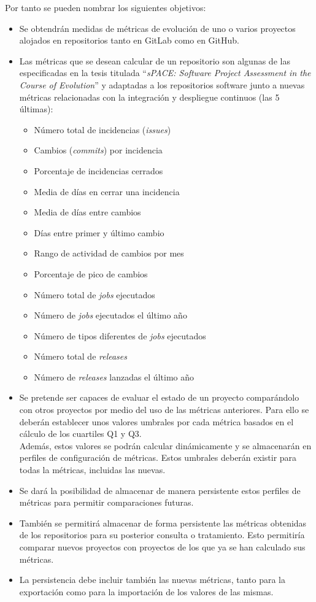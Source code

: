 Por tanto se pueden nombrar los siguientes objetivos:
\begin{itemize}
	\tightlist
	\item Se obtendrán medidas de métricas de evolución de uno o varios proyectos alojados en repositorios tanto en GitLab como en GitHub.
	\item Las métricas que se desean calcular de un repositorio  son algunas de las especificadas en la tesis titulada ``\textit{sPACE: Software Project Assessment in the Course of Evolution}'' \cite{ratzinger_space:_2007} y 
	adaptadas a los repositorios software junto a nuevas métricas relacionadas con la integración y despliegue continuos (las 5 últimas):
	\begin{itemize}
		\tightlist
		\item Número total de incidencias (\textit{issues})
		\item Cambios (\textit{commits}) por incidencia
		\item Porcentaje de incidencias cerrados
		\item Media de días en cerrar una incidencia
		\item Media de días entre cambios
		\item Días entre primer y último cambio
		\item Rango de actividad de cambios por mes
		\item Porcentaje de pico de cambios
		\item Número total de \textit{jobs} ejecutados
		\item Número de \textit{jobs} ejecutados el último año
		\item Número de tipos diferentes de \textit{jobs} ejecutados
		\item Número total de \textit{releases}
		\item Número de \textit{releases} lanzadas el último año
		
	\end{itemize}
	\item Se pretende ser capaces de evaluar el estado de un proyecto comparándolo con otros proyectos por medio del uso de las métricas anteriores. Para ello se deberán establecer unos valores umbrales por cada métrica basados en el cálculo de los cuartiles Q1 y Q3.\\
	 Además, estos valores se podrán calcular dinámicamente y se almacenarán en perfiles de configuración de métricas. Estos umbrales deberán existir para todas la métricas, incluidas las nuevas.
	\item Se dará la posibilidad de almacenar de manera persistente estos perfiles de métricas para permitir comparaciones futuras. 
	\item También se permitirá almacenar de forma persistente las métricas obtenidas de los repositorios para su posterior consulta o tratamiento. Esto permitiría comparar nuevos proyectos con proyectos de los que ya se han calculado sus métricas.
	\item La persistencia debe incluir también las nuevas métricas, tanto para la exportación como para la importación de los valores de las mismas.
\end{itemize}

